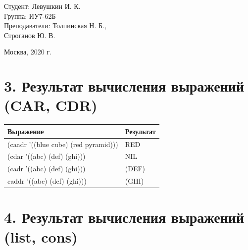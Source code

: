 \documentclass[a4paper,12pt]{article}
\begin{document}
	\vspace*{15mm} 	
	
	\large
	\begin{flushright}
		Студент: Левушкин И. К. \\
		Группа: ИУ7-62Б \\
		Преподаватели: Толпинская Н. Б., \\ Строганов Ю. В. \\
	\end{flushright}
	
	\vspace*{30mm}
	\begin{center}
		Москва, 2020 г.  
	\end{center}
	\thispagestyle{empty}
	
	
	\newpage
	
	\section*{3. Результат вычисления выражений (CAR, CDR)}
	
	\begin{table} [h!]
		\begin{center}
			\begin{tabular}{|l|l|}
				\hline
				{\bf  Выражение} &    {\bf Результат} \\
				\hline
				{ (caadr '((blue cube) (red pyramid)))}& RED\\
				\hline
				{(cdar '((abc) (def) (ghi)))}& NIL\\
				\hline
				{ (cadr '((abc) (def) (ghi)))}& (DEF)\\
				\hline
				{ caddr '((abc) (def) (ghi)))}& (GHI)\\
				\hline
			\end{tabular}  
			\label{m1}
		\end{center}
	\end{table}
	
	\section*{4. Результат вычисления выражений (list, cons)}
	
\end{document}
